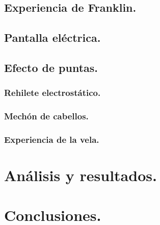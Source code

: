 \documentclass[spanish,10pt,a4paper,onecolumn]{article}
\begin{document}
\subsection{Experiencia de Franklin.}

\subsection{Pantalla eléctrica.}

\subsection{Efecto de puntas.}

\subsubsection{Rehilete electrostático.}

\subsubsection{Mechón de cabellos.}

\subsubsection{Experiencia de la vela.}



\section{Análisis y resultados.}



\section{Conclusiones.}
\end{document}

